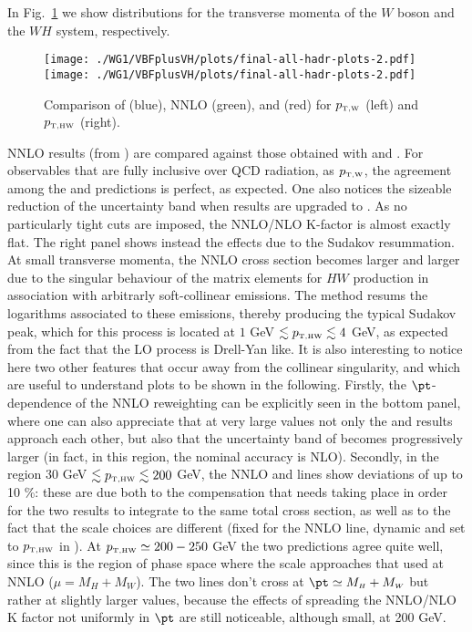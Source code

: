 In Fig.~\ref{fig:extra_ptw_ptwh} we show distributions for the transverse momenta
of the $W$ boson and the $WH$ system, respectively.
\begin{figure}
  \centering
  \texttt{[image: ./WG1/VBFplusVH/plots/final-all-hadr-plots-2.pdf]}
  \texttt{[image: ./WG1/VBFplusVH/plots/final-all-hadr-plots-2.pdf]}
  \caption{Comparison of \HWJMINLOPS{} (blue), NNLO (green), and \HWNNLOPS{} (red) for $p_{\scriptscriptstyle \mathrm{T,W}}$ (left) and $p_{\scriptscriptstyle \mathrm{T,HW}}$ (right). }
  \label{fig:extra_ptw_ptwh}
\end{figure}
NNLO results (from \HVNNLO{}) are compared against those obtained with
\HWJMINLO{} and \HVNNLOPS{}. For observables that are fully inclusive
over QCD radiation, as $p_{\scriptscriptstyle \mathrm{T,W}}$, the agreement among the \HVNNLO{} and
\NNLOPS{} predictions is perfect, as expected. One also notices the
sizeable reduction of the uncertainty band when \HWJMINLO{} results
are upgraded to \NNLOPS{}. As no particularly tight cuts are imposed,
the NNLO/NLO K-factor is almost exactly flat.  The right panel shows
instead the effects due to the Sudakov resummation. At small
transverse momenta, the NNLO cross section becomes larger and larger
due to the singular behaviour of the matrix elements for $HW$
production in association with arbitrarly soft-collinear
emissions. The \MINLO{} method resums the logarithms associated to
these emissions, thereby producing the typical Sudakov peak, which for
this process is located at $1$ GeV $ \lesssim p_{\scriptscriptstyle \mathrm{T,HW}} \lesssim 4$ GeV, as
expected from the fact that the LO process is Drell-Yan like.  It is
also interesting to notice here two other features that occur away
from the collinear singularity, and which are useful to understand
plots to be shown in the following. Firstly, the $\pt$-dependence of
the NNLO reweighting can be explicitly seen in the bottom panel, where
one can also appreciate that at very large values not only the
\NNLOPS{} and \MINLO{} results approach each other, but also that the
uncertainty band of \HVNNLOPS{} becomes progressively larger (in fact,
in this region, the nominal accuracy is NLO). Secondly, in the region
$30$ GeV $\lesssim p_{\scriptscriptstyle \mathrm{T,HW}} \lesssim 200$ GeV, the NNLO and \NNLOPS{}
lines show deviations of up to 10 \%: these are due both to the
compensation that needs taking place in order for the two results to
integrate to the same total cross section, as well as to the fact that
the scale choices are different (fixed for the NNLO line, dynamic and
set to $p_{\scriptscriptstyle \mathrm{T,HW}}$ in \MINLO{}). At $p_{\scriptscriptstyle \mathrm{T,HW}}\simeq 200-250$ GeV the two
predictions agree quite well, since this is the region of phase space
where the \MINLO{} scale approaches that used at NNLO ($\mu =
M_{\scriptscriptstyle H}+M_{\scriptscriptstyle W}$). The two lines
don't cross at $\pt\simeq M_{\scriptscriptstyle
  H}+M_{\scriptscriptstyle W}$ but rather at slightly larger values,
because the effects of spreading the NNLO/NLO K factor not uniformly
in $\pt$ are still noticeable, although small, at 200 GeV.


